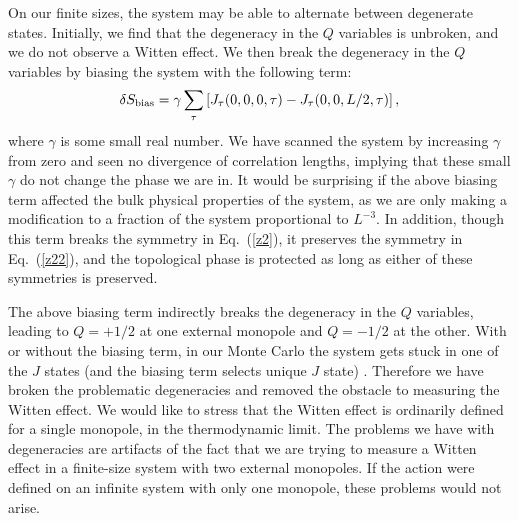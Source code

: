 \documentclass[prb,twocolumn]{revtex4-1}
\begin{document}
On our finite sizes, the system may be able to alternate between degenerate states. Initially, we find that the degeneracy in the $Q$ variables is unbroken, and we do not observe a Witten effect. We then break the degeneracy in the $Q$ variables by biasing the system with the following term:
\begin{equation}
\delta S_{\rm bias}=\gamma  \sum_{\tau}\left[J_\tau(0,0,0,\tau)-J_\tau(0,0,L/2,\tau)\right],
\label{bias}
\end{equation}
where $\gamma$ is some small real number. We have scanned the system by increasing $\gamma$ from zero and seen no divergence of correlation lengths, implying that these small $\gamma$ do not change the phase we are in. It would be surprising if the above biasing term affected the bulk physical properties of the system, as we are only making a modification to a fraction of the system proportional to $L^{-3}$. In addition, though this term breaks the symmetry in Eq.~(\ref{z2}), it preserves the symmetry in Eq.~(\ref{z22}), and the topological phase is protected as long as either of these symmetries is preserved. 

The above biasing term indirectly breaks the degeneracy in the $Q$ variables, leading to $Q=+1/2$ at one external monopole and $Q=-1/2$ at the other. With or without the biasing term, in our Monte Carlo the system gets stuck in one of the $J$ states (and the biasing term selects unique $J$ state) . Therefore we have broken the problematic degeneracies and removed the obstacle to measuring the Witten effect. We would like to stress that the Witten effect is ordinarily defined for a single monopole, in the thermodynamic limit. The problems we have with degeneracies are artifacts of the fact that we are trying to measure a Witten effect in a finite-size system with two external monopoles. If the action were defined on an infinite system with only one monopole, these problems would not arise.
\end{document}
